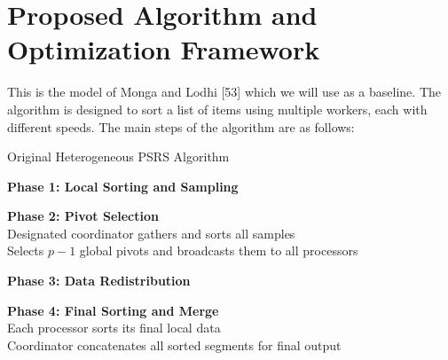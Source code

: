 \documentclass[]{interact}
\theoremstyle{plain}
\theoremstyle{definition}
\theoremstyle{remark}
\begin{document}
\section{Proposed Algorithm and Optimization Framework}

This is the model of Monga and Lodhi [53] which we will use as a baseline. The algorithm is designed to sort a list of items using multiple workers, each with different speeds. The main steps of the algorithm are as follows:

\begin{algorithm}[H]
\caption{Original Heterogeneous PSRS Algorithm}

\vspace{0.5em}
\textbf{Phase 1: Local Sorting and Sampling} \\

\vspace{0.5em}
\textbf{Phase 2: Pivot Selection} \\
Designated coordinator gathers and sorts all samples \\
Selects $p - 1$ global pivots and broadcasts them to all processors

\vspace{0.5em}
\textbf{Phase 3: Data Redistribution} \\

\vspace{0.5em}
\textbf{Phase 4: Final Sorting and Merge} \\
Each processor sorts its final local data \\
Coordinator concatenates all sorted segments for final output
\end{algorithm}
\end{document}
